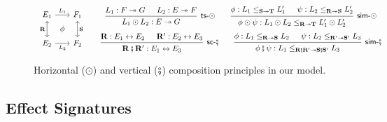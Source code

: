 \begin{figure} %
  \[
  \begin{array}{c}
    \begin{tikzcd}[sep=0.5ex]
      E_1 \ar[dd, leftrightarrow, "\mathbf{R}"']
	  \ar[rr, "L_1"] &&
      F_1 \ar[dd, leftrightarrow, "\mathbf{S}"] \\
      & \phi & \\
      E_2 \ar[rr, "L_2"'] &&
      F_2
    \end{tikzcd}
  \end{array}
  \quad
  \begin{array}{c}
    \begin{prooftree}
      \hypo{L_1 : F \twoheadrightarrow G}
      \hypo{L_2 : E \twoheadrightarrow F}
      \infer2[\kw{ts}-$\odot$]{L_1 \odot L_2 : E \twoheadrightarrow G}
    \end{prooftree}
    \qquad
    \begin{prooftree}
      \hypo{\phi: L_1 \le_{\mathbf{S} \twoheadrightarrow \mathbf{T}} L_1'}
      \hypo{\psi: L_2 \le_{\mathbf{R} \twoheadrightarrow \mathbf{S}} L_2'}
      \infer2[\kw{sim}-$\odot$]{\phi \odot \psi :
	L_1 \odot L_2 \le_{\mathbf{R} \twoheadrightarrow \mathbf{T}} L_1' \odot L_2'}
    \end{prooftree}
    \\[1.5em]
    \begin{prooftree}
      \hypo{\mathbf{R} : E_1 \leftrightarrow E_2}
      \hypo{\mathbf{R}' : E_2 \leftrightarrow E_3}
      \infer2[\kw{sc}-$\vcomp$]{\mathbf{R} \vcomp \mathbf{R}' : E_1 \leftrightarrow E_3}
    \end{prooftree}
    \qquad
    \begin{prooftree}
      \hypo{\phi : L_1 \le_{\mathbf{R} \twoheadrightarrow \mathbf{S}} L_2}
      \hypo{\psi : L_2 \le_{\mathbf{R'} \twoheadrightarrow \mathbf{S'}} L_3}
      \infer2[\kw{sim}-$\vcomp$]{\phi \vcomp \psi : L_1 \le_{\mathbf{R} \vcomp \mathbf{R'} \twoheadrightarrow
	\mathbf{S} \vcomp \mathbf{S'}} L_3}
    \end{prooftree}
  \end{array}
\]
  \caption{Horizontal ($\odot$) and vertical ($\fatsemi$)
    composition principles in our model.}
  \label{fig:hvcomp}
\end{figure}

\subsection{Effect Signatures} \label{sec:esig} %


